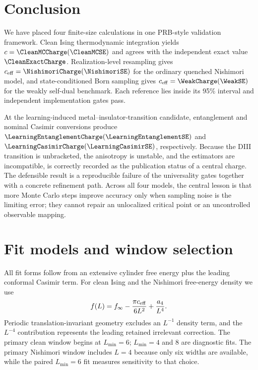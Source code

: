 \documentclass[aps,prb,reprint,superscriptaddress,longbibliography,floatfix]{revtex4-2}
\begin{document}
\section{Conclusion}
\label{sec:conclusion}

We have placed four finite-size calculations in one PRB-style validation
framework.  Clean Ising thermodynamic integration yields
$c=\CleanMCCharge(\CleanMCSE)$ and agrees with the independent exact value
$\CleanExactCharge$.  Realization-level resampling gives
$c_{\rm eff}=\NishimoriCharge(\NishimoriSE)$ for the ordinary quenched
Nishimori model, and state-conditioned Born sampling gives
$c_{\rm eff}=\WeakCharge(\WeakSE)$ for the weakly self-dual benchmark.  Each
reference lies inside its 95\% interval and independent implementation gates
pass.

At the learning-induced metal--insulator-transition candidate, entanglement
and nominal Casimir conversions produce
$\LearningEntanglementCharge(\LearningEntanglementSE)$ and
$\LearningCasimirCharge(\LearningCasimirSE)$, respectively.  Because the DIII
transition is unbracketed, the anisotropy is unstable, and the estimators are
incompatible, \LearningPublished{} is correctly recorded as the publication
status of a central charge.  The defensible result is a reproducible failure
of the universality gates together with a concrete refinement path.  Across
all four models, the central lesson is that more Monte Carlo steps improve
accuracy only when sampling noise is the limiting error; they cannot repair an
unlocalized critical point or an uncontrolled observable mapping.

\appendix

\section{Fit models and window selection}
\label{app:fit-models}

All fit forms follow from an extensive cylinder free energy plus the leading
conformal Casimir term.  For clean Ising and the Nishimori free-energy density
we use
\begin{equation}
 f(L)=f_\infty-\frac{\pi c_{\rm eff}}{6L^2}
      +\frac{a_4}{L^4}.
\end{equation}
Periodic translation-invariant geometry excludes an $L^{-1}$ density term,
and the $L^{-4}$ contribution represents the leading retained irrelevant
correction.  The primary clean window begins at $L_{\min}=6$; $L_{\min}=4$
and 8 are diagnostic fits.  The primary Nishimori window includes $L=4$
because only six widths are available, while the paired $L_{\min}=6$ fit
measures sensitivity to that choice.
\end{document}
